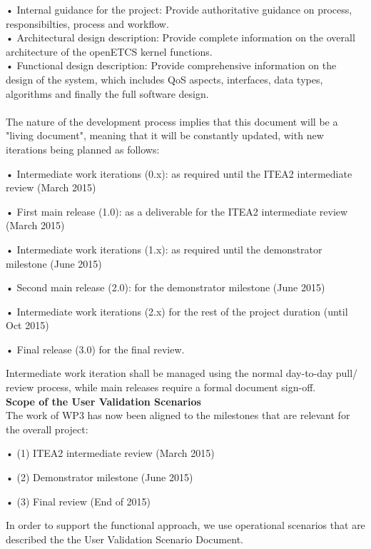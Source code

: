 • Internal guidance for the project: Provide authoritative guidance on process, responsibilties, process and workflow.\\
 
• Architectural design description: Provide complete information on the overall architecture of the openETCS kernel functions.\\

• Functional design description: Provide comprehensive information on the design of the system, which includes QoS aspects, interfaces, data types, algorithms and finally the full software design.\\
\\

The nature of the development process implies that this document will be a "living document", meaning that it will be constantly updated, with new iterations being planned as follows:

•  Intermediate work iterations (0.x): as required until the ITEA2 intermediate review (March 2015)

• First main release (1.0): as a deliverable for the ITEA2 intermediate review (March 2015)

• Intermediate work iterations (1.x): as required until the demonstrator milestone (June 2015)

•  Second main release (2.0): for the demonstrator milestone (June 2015)

•  Intermediate work iterations (2.x) for the rest of the project duration (until Oct 2015)

•  Final release (3.0) for the final review.

Intermediate work iteration shall be managed using the normal day-to-day pull/ review process, while main releases require a formal document sign-off.\\

\textbf{Scope of the User Validation Scenarios}\\

The work of WP3 has now been aligned to the milestones that are relevant for the overall project:

•  (1) ITEA2 intermediate review (March 2015)

•  (2) Demonstrator milestone (June 2015)

•  (3) Final review (End of 2015)

In order to support the functional approach, we use operational scenarios that are described the the User Validation Scenario Document.

